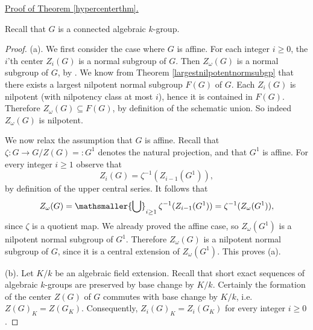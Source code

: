 \documentclass[twoside,a4paper,reqno,11pt]{amsart}
\theoremstyle{definition}
\begin{document}
\noindent \underline{Proof of Theorem \ref{hypercenterthm}.}

\vspace{2mm}\noindent Recall that $G$ is a connected algebraic $k$-group.

\begin{proof} (a). We first consider the case where $G$ is affine. For each integer $i\geq 0$, the $i$'th center $Z_i(G)$ is a normal subgroup of $G$. Then $Z_\omega(G)$ is a normal subgroup of $G$, by \cite[Prop.\ 2.2]{S}. We know from Theorem \ref{largestnilpotentnormsubgp} that there exists a largest nilpotent normal subgroup $F(G)$ of $G$. Each $Z_i(G)$ is nilpotent (with nilpotency class at most $i$), %
hence it is contained in $F(G)$. Therefore $Z_\omega(G)\subseteq F(G)$, by definition of the schematic union. So indeed $Z_\omega(G)$ is nilpotent.

\vspace{2mm}\noindent We now relax the assumption that $G$ is affine. Recall that $\zeta:G\to G/Z(G)=:G^1$ denotes the natural projection, and that $G^1$ is affine. For every integer $i\geq 1$ observe that $$Z_i(G)=\zeta^{-1}(Z_{i-1}(G^1)),$$ by definition of the upper central series. It follows that \begin{equation}\label{pulling} Z_\omega(G)=\mathsmaller{\bigcup}_{i\geq 1}\,\zeta^{-1}(Z_{i-1}(G^1))=\zeta^{-1}(Z_{\omega}(G^1)),\end{equation} since $\zeta$ is a quotient map. We already proved the affine case, so $Z_{\omega}(G^1)$ is a nilpotent normal subgroup of $G^1$. Therefore $Z_\omega(G)$ is a nilpotent normal subgroup of $G$, since it is a central extension of $Z_{\omega}(G^1)$. This proves (a).

\vspace{2mm}\noindent (b). Let $K/k$ be an algebraic field extension. Recall that short exact sequences of algebraic $k$-groups are preserved by base change by $K/k$. %
Certainly the formation of the center $Z(G)$ of $G$ commutes with base change by $K/k$, i.e. $Z(G)_K=Z(G_K)$. Consequently, $Z_i(G)_K=Z_i(G_K)$ for every integer $i\geq 0$.


\end{proof}
\end{document}
